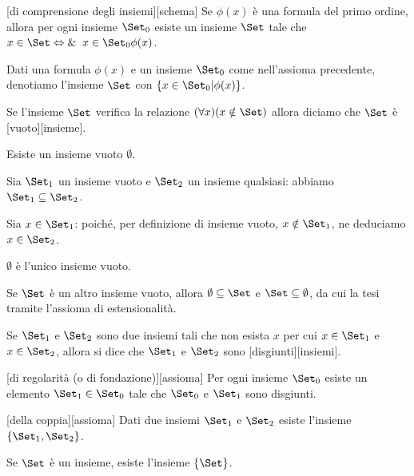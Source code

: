 \begin{Axiom}
	[di comprensione degli insiemi][schema] Se $\phi(x)$ \`e una formula del primo ordine, allora per ogni insieme $\Set_0$ esiste un insieme $\Set$ tale che $x \in \Set \Leftrightarrow \And{x \in \Set_0}{\phi(x)}$.
\end{Axiom}
\par Dati una formula $\phi(x)$ e un insieme $\Set_0$ come nell'assioma precedente, denotiamo l'insieme $\Set$ con $\lbrace x \in \Set_0 | \phi(x) \rbrace$.
\begin{Definition}
	Se l'insieme $\Set$ verifica la relazione $(\forall x)(x \notin \Set)$ allora diciamo che $\Set$ \`e [vuoto][insieme].
\end{Definition}
\begin{Axiom}
	Esiste un insieme vuoto $\emptyset$.
\end{Axiom}
\begin{Theorem}
	Sia $\Set_1$ un insieme vuoto e $\Set_2$ un insieme qualsiasi: abbiamo $\Set_1 \subseteq \Set_2$.
\end{Theorem}
\Proof Sia $x \in \Set_1$: poich\'e, per definizione di insieme vuoto, $x \notin \Set_1$, ne deduciamo $x \in \Set_2$. \EndProof
\begin{Corollary}
	$\emptyset$ \`e l'unico insieme vuoto.
\end{Corollary}
\Proof Se $\Set$ \`e un altro insieme vuoto, allora $\emptyset \subseteq \Set$ e $\Set \subseteq \emptyset$, da cui la tesi tramite l'assioma di estensionalit\`a. \EndProof
\begin{Definition}
	Se $\Set_1$ e $\Set_2$ sono due insiemi tali che non esista $x$ per cui  $x \in \Set_1$ e $x \in \Set_2$, allora si dice che $\Set_1$ e $\Set_2$ sono [disgiunti][insiemi].
\end{Definition}
\begin{Axiom}
	[di regolarit\`a (o di fondazione)][assioma] Per ogni insieme $\Set_0$ esiste un elemento $\Set_1 \in \Set_0$ tale che $\Set_0$ e $\Set_1$ sono disgiunti.
\end{Axiom}
\begin{Axiom}
	[della coppia][assioma] Dati due insiemi $\Set_1$ e $\Set_2$ esiste l'insieme $\lbrace \Set_1, \Set_2 \rbrace$.
\end{Axiom}
\begin{Theorem}
	Se $\Set$ \`e un insieme, esiste l'insieme $\lbrace \Set \rbrace$.
\end{Theorem}
